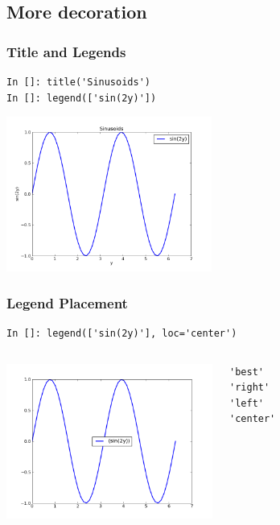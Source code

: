 \documentclass[14pt,compress]{beamer}
\newcounter{time}
\newcommand{\inctime}[1]{\addtocounter{time}{#1}{\tiny \thetime\ m}}
\begin{document}
\subsection{More decoration}
\begin{frame}[fragile]
\frametitle{Title and Legends}
\vspace*{-0.15in}
\begin{lstlisting}
In []: title('Sinusoids')
In []: legend(['sin(2y)'])
\end{lstlisting}
  \vspace*{-0.1in}
  \begin{center}
  \includegraphics[height=2in, interpolate=true]{data/legend}
  \end{center}
\end{frame}

\begin{frame}[fragile]
\frametitle{Legend Placement}
\begin{block}{}
    \small
\begin{lstlisting}
In []: legend(['sin(2y)'], loc='center')
\end{lstlisting}
\end{block}

\begin{columns}
 \includegraphics[height=2in, interpolate=true]{data/position}
\vspace{-0.2in}
\begin{lstlisting}
'best'
'right'
'left'
'center'
\end{lstlisting}
\end{columns}
\inctime{15}
\end{frame}
\end{document}
